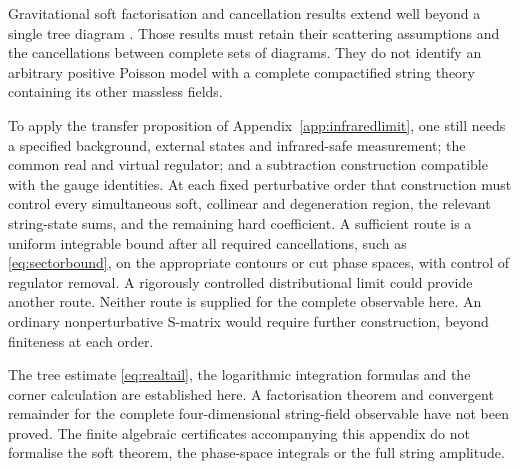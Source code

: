 Gravitational soft factorisation and cancellation results extend well beyond a single tree diagram \cite{Weinberg65,ASS11}. Those results must retain their scattering assumptions and the cancellations between complete sets of diagrams. They do not identify an arbitrary positive Poisson model with a complete compactified string theory containing its other massless fields.

To apply the transfer proposition of Appendix~\ref{app:infraredlimit}, one still needs a specified background, external states and infrared-safe measurement; the common real and virtual regulator; and a subtraction construction compatible with the gauge identities. At each fixed perturbative order that construction must control every simultaneous soft, collinear and degeneration region, the relevant string-state sums, and the remaining hard coefficient. A sufficient route is a uniform integrable bound after all required cancellations, such as \eqref{eq:sectorbound}, on the appropriate contours or cut phase spaces, with control of regulator removal. A rigorously controlled distributional limit could provide another route. Neither route is supplied for the complete observable here. An ordinary nonperturbative S-matrix would require further construction, beyond finiteness at each order.

The tree estimate \eqref{eq:realtail}, the logarithmic integration formulas and the corner calculation are established here. A factorisation theorem and convergent remainder for the complete four-dimensional string-field observable have not been proved. The finite algebraic certificates accompanying this appendix do not formalise the soft theorem, the phase-space integrals or the full string amplitude.
